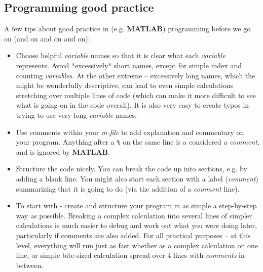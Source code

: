 \documentclass{tufte-book} %
\begin{document}

\subsection{Programming good practice}

A few tips about good practice in (e.g. \textbf{MATLAB}) programming before we go on (and on and on and on):

\begin{itemize}[noitemsep]
\setlength{\itemindent}{.2in}

\item Choose helpful \textit{variable} names so that it is clear what each \textit{variable} represents. Avoid *excessively* short names, except for simple index and counting \textit{variables}. At the other extreme -- excessively long names, which the might be wonderfully descriptive, can lead to even simple calculations stretching over multiple lines of code (which can make it more difficult to see what is going on in the code overall). It is also very easy to create typos in trying to use very long \textit{variable} names.

\vspace{1mm}
\item Use comments within your \textit{m-file} to add explanation and commentary on your program. Anything after a \texttt{\%} on the same line is a considered a \textit{comment}, and is ignored by \textbf{MATLAB}.

\vspace{1mm}
\item Structure the code nicely. You can break the code up into sections, e.g. by adding a blank line. You might also start each section with a label (\textit{comment}) summarizing that it is going to do (via the addition of a \textit{comment} line).

\vspace{1mm}
\item To start with - create and structure your program in as simple a step-by-step way as possible. Breaking a complex calculation into several lines of simpler calculations is much easier to debug and work out what you were doing later, particularly if comments are also added. For all practical purposes -- at this level, everything will run just as fast whether as a complex calculation on one line, or simple bite-sized calculation spread over 4 lines with \textit{comments} in between. 


\end{itemize}
\end{document}
